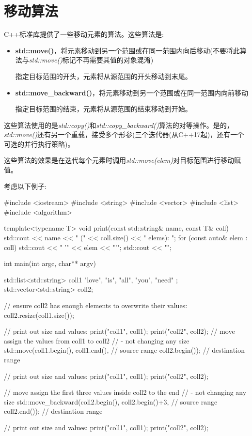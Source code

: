 \section{移动算法}
C++标准库提供了一些移动元素的算法。这些算法是:

\begin{itemize}
	\item \textbf{std::move()}，将元素移动到另一个范围或在同一范围内向后移动(不要将此算法与\textit{std::move()}标记不再需要其值的对象混淆)

	指定目标范围的开头，元素将从源范围的开头移动到末尾。
	\item \textbf{std::move_backward()}，将元素移动到另一个范围或在同一范围内向前移动

	指定目标范围的结束，元素将从源范围的结束移动到开始。
\end{itemize}

这些算法使用的是\textit{std::copy()}和\textit{std::copy_backward()}算法的对等操作。是的，\textit{std::move()}还有另一个重载，接受多个形参(三个迭代器(从C++17起)，还有一个可选的并行执行策略)。

这些算法的效果是在迭代每个元素时调用\textit{std::move(elem)}对目标范围进行移动赋值。

考虑以下例子:

\begin{cppcode}
#include <iostream>
#include <string>
#include <vector>
#include <list>
#include <algorithm>

template<typename T>
void print(const std::string& name, const T& coll)
{
	std::cout << name << " (" << coll.size() << " elems): ";
	for (const auto& elem : coll) {
		std::cout << " '" << elem << "'";
	}
	std::cout << "\n";
}

int main(int argc, char** argv)
{
	std::list<std::string> coll1 { "love", "is", "all", "you", "need" };
	std::vector<std::string> coll2;
	
	// ensure coll2 has enough elements to overwrite their values:
	coll2.resize(coll1.size());
	
	// print out size and values:
	print("coll1", coll1);
	print("coll2", coll2);
	// move assign the values from coll1 to coll2
	// - not changing any size
	std::move(coll1.begin(), coll1.end(), // source range
	coll2.begin()); // destination range
	
	// print out size and values:
	print("coll1", coll1);
	print("coll2", coll2);
	
	// move assign the first three values inside coll2 to the end
	// - not changing any size
	std::move_backward(coll2.begin(), coll2.begin()+3, // source range
	coll2.end()); // destination range
	
	// print out size and values:
	print("coll1", coll1);
	print("coll2", coll2);
}
\end{cppcode}

